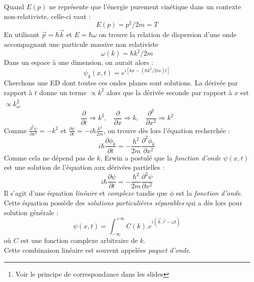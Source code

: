 \documentclass	[11pt, a4paper, openany]{book}
\begin{document}
	Quand $E(p)$ ne représente que l'énergie purement cinétique dans un contexte non-relativiste, celle-ci vaut :
	\begin{equation}
		E(p) = p^2/2m=T
	\end{equation}
	En utilisant $\vec{p} = \hbar \vec{k}$ et $E = \hbar\omega$ on trouve la relation de dispersion d'une onde accompagnant une particule massive non relativiste
	\begin{equation}
		\omega (k) = \hbar k^2/2m
	\end{equation}
	Dans un espace à une dimension, on aurait alors : 
	\begin{equation}
		\psi_k(x,t) = e^{i[kx -(\hbar k^2/2m)t]}
	\end{equation}
	Cherchons une ED dont toutes ces ondes planes sont solutions. La dérivée par rapport à $t$ donne un terme $\propto k^2$ alors que la dérivée seconde par rapport à $x$ est $\propto k$\footnote{Voir le principe de correspondance dans les slides}.
	\begin{equation}
		\frac{\partial}{\partial t} \Rightarrow k^2,\ \ \ \ \frac{\partial}{\partial x} \Rightarrow k,\ \ \ \ \frac{\partial^2}{\partial x^2} \Rightarrow k^2
	\end{equation}
	Comme $\frac{\partial^2 \psi}{\partial x^2}=-k^2$ et $\frac{\partial\psi}{\partial t}=-i\hbar\frac{k^2}{2m}$, on trouve dès lors l'équation recherchée :
	\begin{equation}
		i\hbar \frac{\partial \phi_k}{\partial t} = -\frac{\hbar^2}{2m}\frac{\partial^2 \phi_k}{\partial x^2}
	\end{equation}
	Comme cela ne dépend pas de $k$, Erwin a postulé que la \textit{fonction d'onde} $\psi (x,t)$ est une solution de l'équation aux dérivées partielles : 
	\begin{equation}
		i\hbar \frac{\partial \psi}{\partial t} = -\frac{\hbar^2}{2m}\frac{\partial^2 \psi}{\partial x^2}
	\end{equation}
	Il s'agit d'une équation \textit{linéaire} et \textit{complexe} tandis que $\phi$ est la \textit{fonction d'onde}.\\
	
	
	Cette équation possède des \textit{solutions particulières séparables} qui a dès lors pour solution générale :
	\begin{equation}
		\psi (x,t) = \int_{-\infty}^{+\infty} C(k).e^{i(\vec{k}.\vec{r} - \omega t)}
	\end{equation}
	où $C$ est une fonction complexe arbitraire de $k$.\\
	Cette combinaison linéaire est souvent appelées \textit{paquet d'onde}.\\
	
\end{document}
